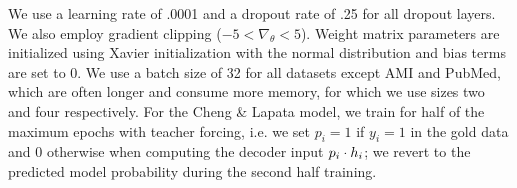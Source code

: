     We use a learning rate of .0001 and a dropout rate of .25 for all dropout
    layers. We also employ gradient clipping ($-5 < \nabla_\theta < 5$).
Weight matrix parameters are initialized using 
    Xavier initialization with the normal distribution 
    \cite{glorot2010understanding} and bias terms are set to 0.
    We use a batch size of 32 for all datasets except AMI and PubMed, which
    are often longer and consume more memory, for
    which we use sizes two and four respectively.
    For the Cheng \& Lapata model, we train for half of the maximum epochs 
    with teacher forcing, i.e. we set $p_i = 1$
    if $y_i = 1$ in the gold data and 0 otherwise 
    when computing the decoder input 
    $p_i \cdot \sentEmb[i]$; we revert to the predicted model probability 
    during the second half training.




